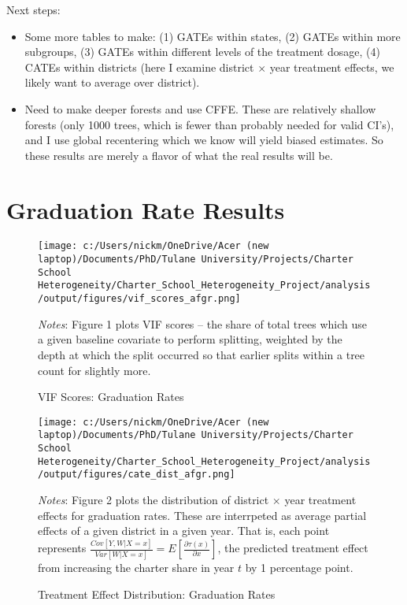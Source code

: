 \documentclass{article} %
\begin{document}
	Next steps:
\begin{itemize}
	\item Some more tables to make: (1) GATEs within states, (2) GATEs within more subgroups, (3) GATEs within different levels of the treatment dosage, (4) CATEs within districts (here I examine district $\times$ year treatment effects, we likely want to average over district).
	\item Need to make deeper forests and use CFFE. These are relatively shallow forests (only 1000 trees, which is fewer than probably needed for valid CI's), and I use global recentering which we know will yield biased estimates. So these results are merely a flavor of what the real results will be.
\end{itemize}

	\section{Graduation Rate Results}

\begin{figure}[H]
\centering
\texttt{[image: c:/Users/nickm/OneDrive/Acer (new laptop)/Documents/PhD/Tulane University/Projects/Charter School Heterogeneity/Charter\_School\_Heterogeneity\_Project/analysis/output/figures/vif\_scores\_afgr.png]}
\caption{VIF Scores: Graduation Rates}
\label{fig:image1}
\begin{minipage}{1\linewidth}
\singlespacing
\footnotesize
\emph{Notes}: Figure 1 plots VIF scores -- the share of total trees which use a given baseline covariate to perform splitting, weighted by the depth at which the split occurred so that earlier splits within a tree count for slightly more.  
\end{minipage}
\end{figure}


\begin{figure}[H]
\centering
\texttt{[image: c:/Users/nickm/OneDrive/Acer (new laptop)/Documents/PhD/Tulane University/Projects/Charter School Heterogeneity/Charter\_School\_Heterogeneity\_Project/analysis/output/figures/cate\_dist\_afgr.png]}
\caption{Treatment Effect Distribution: Graduation Rates}
\label{fig:image2}
\begin{minipage}{1\linewidth}
\singlespacing
\footnotesize
\emph{Notes}: Figure 2 plots the distribution of district $\times$ year treatment effects for graduation rates. These are interrpeted as average partial effects of a given district in a given year. That is, each point represents $\frac{Cov[Y, W | X = x]}{Var[W | X = x]} = E\left[ \frac{\partial \tau(x)}{\partial x} \right]$, the predicted treatment effect from increasing the charter share in year $t$ by 1 percentage point.
\end{minipage}
\end{figure}
\end{document}
